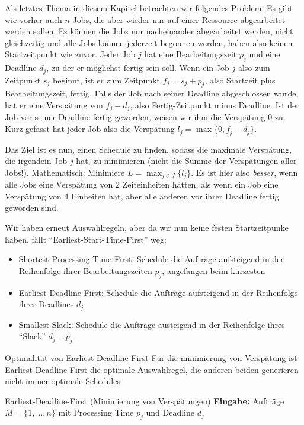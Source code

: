 \documentclass{panikzettel}
\begin{document}
{Als letztes Thema in diesem Kapitel betrachten wir folgendes Problem: Es gibt wie vorher auch $n$ Jobs, die aber wieder nur auf einer Ressource abgearbeitet werden sollen. Es können die Jobs nur nacheinander abgearbeitet werden, nicht gleichzeitig und alle Jobs können jederzeit begonnen werden, haben also keinen Startzeitpunkt wie zuvor. Jeder Job $j$ hat eine Bearbeitungszeit $p_j$ und eine Deadline $d_j$, zu der er möglichst fertig sein soll. Wenn ein Job $j$ also zum Zeitpunkt $s_j$ beginnt, ist er zum Zeitpunkt $f_j = s_j + p_j$, also Startzeit plus Bearbeitungszeit, fertig. Falls der Job nach seiner Deadline abgeschlossen wurde, hat er eine Verspätung von $f_j - d_j$, also Fertig-Zeitpunkt minus Deadline. Ist der Job vor seiner Deadline fertig geworden, weisen wir ihm die Verspätung 0 zu. Kurz gefasst hat jeder Job also die Verspätung $l_j = \max \{0, f_j - d_j\}$.  

Das Ziel ist es nun, einen Schedule zu finden, sodass die maximale Verspätung, die irgendein Job $j$ hat, zu minimieren (nicht die Summe der Verspätungen aller Jobs!). Mathematisch: Minimiere $L = \max_{j \in J} \{l_j\}$. Es ist hier also \emph{besser}, wenn alle Jobs eine Verspätung von 2 Zeiteinheiten hätten, als wenn ein Job eine Verspätung von 4 Einheiten hat, aber alle anderen vor ihrer Deadline fertig geworden sind. 

Wir haben erneut Auswahlregeln, aber da wir nun keine festen Startzeitpunke haben, fällt ``Earliest-Start-Time-First'' weg:

\begin{itemize}
	\item Shortest-Processing-Time-First: Schedule die Aufträge aufsteigend in der Reihenfolge ihrer Bearbeitungszeiten $p_j$, angefangen beim kürzesten
	\item Earliest-Deadline-First: Schedule die Aufträge aufsteigend in der Reihenfolge ihrer Deadlines $d_j$
	\item Smallest-Slack: Schedule die Aufträge austeigend in der Reihenfolge ihres ``Slack'' $d_j - p_j$
\end{itemize} 

\begin{theo}{Optimalität von Earliest-Deadline-First}
	Für die minimierung von Verspätung ist Earliest-Deadline-First die optimale Auswahlregel, die anderen beiden generieren nicht immer optimale Schedules
\end{theo}

\begin{algo}{Earliest-Deadline-First (Minimierung von Verspätungen)}
	\textbf{Eingabe:} Aufträge $M= \{1, \dots , n\}$ mit Processing Time $p_j$ und Deadline $d_j$
	

\end{algo}}
\end{document}
